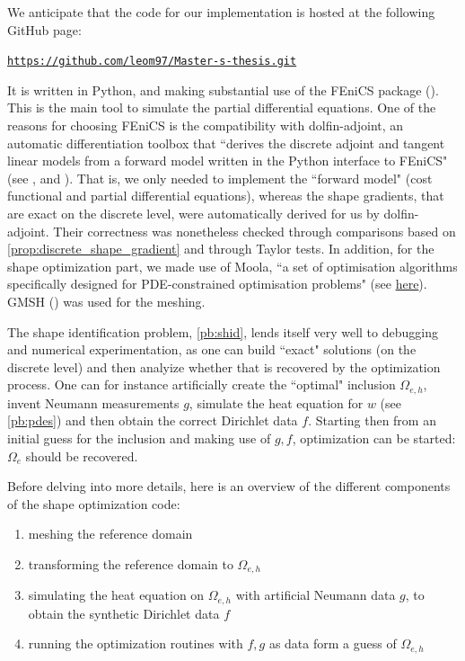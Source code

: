 \documentclass[english,a4paper,9pt,oneside]{scrbook}	%
\theoremstyle{break}
\theoremstyle{remark}
\begin{document}
We anticipate that the code for our implementation is hosted at the following GitHub page: 
\begin{center}
\href{https://github.com/leom97/Master-s-thesis.git}{\texttt{https://github.com/leom97/Master-s-thesis.git}}
\end{center}
It is written in Python, and making substantial use of the FEniCS package (\cite{fenics}). This is the main tool to simulate the partial differential equations. One of the reasons for choosing FEniCS is the compatibility with dolfin-adjoint, an automatic differentiation toolbox that ``derives the discrete adjoint and tangent linear models from a forward model written in the Python interface to FEniCS" (see \cite{dolfin-adjoint_1}, \cite{dolfin-adjoint_2} and \cite{dolfin-adjoint_3}). That is, we only needed to implement the ``forward model" (cost functional and partial differential equations), whereas the shape gradients, that are exact on the discrete level, were automatically derived for us by dolfin-adjoint. Their correctness was nonetheless checked through comparisons based on \cref{prop:discrete_shape_gradient} and through Taylor tests. In addition, for the shape optimization part, we made use of Moola, ``a set of optimisation algorithms specifically designed for PDE-constrained optimisation problems" (see \href{https://github.com/funsim/moola}{here}). GMSH (\cite{gmsh}) was used for the meshing.

The shape identification problem, \cref{pb:shid}, lends itself very well to debugging and numerical experimentation, as one can build ``exact" solutions (on the discrete level) and then analyize whether that is recovered by the optimization process. One can for instance artificially create the ``optimal" inclusion $\Omega_{e,h}$, invent Neumann measurements $g$, simulate the heat equation for $w$ (see \cref{pb:pdes}) and then obtain the correct Dirichlet data $f$. Starting then from an initial guess for the inclusion and making use of $g,f$, optimization can be started: $\Omega_e$ should be recovered.

Before delving into more details, here is an overview of the different components of the shape optimization code:
\begin{enumerate}
	\item meshing the reference domain
	\item transforming the reference domain to $\Omega_{e,h}$
	\item simulating the heat equation on $\Omega_{e,h}$ with artificial Neumann data $g$, to obtain the synthetic Dirichlet data $f$
	\item running the optimization routines with $f,g$ as data form a guess of $\Omega_{e,h}$
\end{enumerate}
\end{document}
